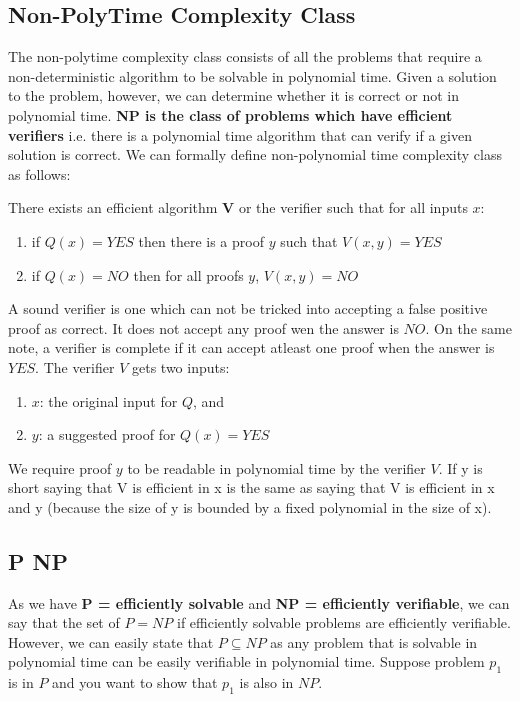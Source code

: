  \subsection{Non-PolyTime Complexity Class}
 The non-polytime complexity class consists of all the problems that require a non-deterministic algorithm to be solvable in polynomial time. Given a solution to the problem, however, we can determine whether it is correct or not in polynomial time. \textbf{NP is the class of problems which have efficient verifiers} i.e. there is a polynomial time algorithm that can verify if a given solution is correct. We can formally define non-polynomial time complexity class as follows:
 
There exists an efficient algorithm $\textbf{V}$ or the verifier such that for all inputs $x$:
\begin{enumerate}
    \item if $Q(x) = YES$ then there is a proof $y$ such that $V(x,y) = YES$
    \item if $Q(x) = NO$ then for all proofs $y$, $V(x,y) = NO$
\end{enumerate}

A sound verifier is one which can not be tricked into accepting a false positive proof as correct. It does not accept any proof wen the answer is $NO$. On the same note, a verifier is complete if it can accept atleast one proof when the answer is $YES$. The verifier $V$ gets two inputs:

\begin{enumerate}
    \item $x$: the original input for $Q$, and
    \item $y$: a suggested proof for $Q(x) = YES$
\end{enumerate}

We require proof $y$ to be readable in polynomial time by the verifier $V$. If y is short saying that V is efficient in x is the same as saying that V is efficient in x and y (because the size of y is bounded by a fixed polynomial in the size of x).

\subsection{P \subseteq NP}
As we have \textbf{P = efficiently solvable} and \textbf{NP = efficiently verifiable}, we can say that the set of $P = NP$ if efficiently solvable problems are efficiently verifiable. However, we can easily state that $P \subseteq NP$ as any problem that is solvable in polynomial time can be easily verifiable in polynomial time. Suppose problem $p_1$ is in $P$ and you want to show that $p_1$ is also in $NP$.

